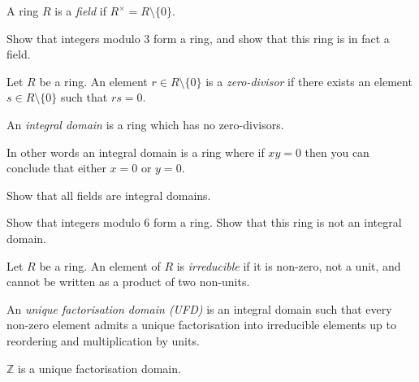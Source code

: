 \documentclass[a4paper,11pt]{article}
\begin{document}
    \begin{definition}
      A ring \(R\) is a \emph{field} if \(R^\times = R \setminus \{0\}\).
    \end{definition}

    \begin{exercise}
      Show that integers modulo \(3\) form a ring, and show that this ring is in fact a field.
    \end{exercise}

    \begin{definition}
      Let \(R\) be a ring. An element \(r \in R \setminus \{0\}\) is a \emph{zero-divisor} if there exists an element \(s \in R \setminus \{0\}\) such that \(rs = 0\).
    \end{definition}

    \begin{definition}
      An \emph{integral domain} is a ring which has no zero-divisors.
    \end{definition}

    In other words an integral domain is a ring where if \(xy = 0\) then you can conclude that either \(x = 0\) or \(y = 0\).

    \begin{exercise}
      Show that all fields are integral domains.
    \end{exercise}

    \begin{exercise}
      Show that integers modulo \(6\) form a ring. Show that this ring is not an integral domain.
    \end{exercise}

    \begin{definition}
      Let \(R\) be a ring. An element of \(R\) is \emph{irreducible} if it is non-zero, not a unit, and cannot be written as a product of two non-units.
    \end{definition}

    \begin{definition}
      An \emph{unique factorisation domain (UFD)} is an integral domain such that every non-zero element admits a unique factorisation into irreducible elements up to reordering and multiplication by units.
    \end{definition}

    \begin{example}
      \(\mathbb{Z}\) is a unique factorisation domain.
    \end{example}
\end{document}

